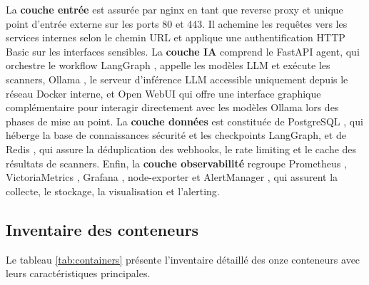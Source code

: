         La \textbf{couche entrée} est assurée par nginx \cite{NGINX} en tant que reverse
        proxy et unique point d'entrée externe sur les ports 80 et 443. Il achemine les
        requêtes vers les services internes selon le chemin URL et applique une
        authentification HTTP Basic sur les interfaces sensibles. La \textbf{couche IA}
        comprend le FastAPI \cite{FastAPI} agent, qui orchestre le workflow LangGraph
        \cite{LangGraph}, appelle les modèles LLM et exécute les scanners, Ollama
        \cite{Ollama}, le serveur d'inférence LLM accessible uniquement depuis le réseau
        Docker \cite{Docker} interne, et Open WebUI qui offre une interface graphique
        complémentaire pour interagir directement avec les modèles Ollama lors des phases
        de mise au point. La \textbf{couche données} est constituée de
        PostgreSQL \cite{PostgreSQL}, qui héberge la base de connaissances sécurité et les
        checkpoints LangGraph, et de Redis \cite{Redis}, qui assure la déduplication des
        webhooks, le rate limiting et le cache des résultats de scanners. Enfin, la
        \textbf{couche observabilité} regroupe Prometheus \cite{Prometheus},
        VictoriaMetrics \cite{VictoriaMetrics}, Grafana \cite{Grafana},
        node-exporter \cite{NodeExporter} et AlertManager \cite{AlertManager}, qui
        assurent la collecte, le stockage, la visualisation et l'alerting.

    \subsection{Inventaire des conteneurs}

        Le tableau \ref{tab:containers} présente l'inventaire détaillé des onze conteneurs
        avec leurs caractéristiques principales.

